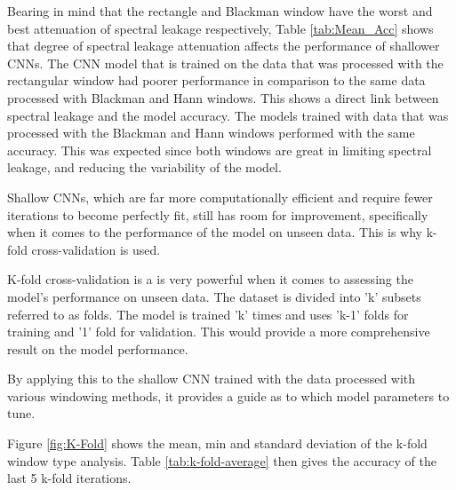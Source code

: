 \documentclass[class=report,11pt,crop=false]{standalone}
\begin{document}
Bearing in mind that the rectangle and Blackman window have the worst and best attenuation of spectral leakage respectively, Table \ref{tab:Mean_Acc} shows that degree of spectral leakage attenuation affects the performance of shallower CNNs. The CNN model that is trained on the data that was processed with the rectangular window had poorer performance in comparison to the same data processed with Blackman and Hann windows. This shows a direct link between spectral leakage and the model accuracy. The models trained with data that was processed with the Blackman and Hann windows performed with the same accuracy. This was expected since both windows are great in limiting spectral leakage, and reducing the variability of the model. 





Shallow CNNs, which are far more computationally efficient and require fewer iterations to become perfectly fit, still has room for improvement, specifically when it comes to the performance of the model on unseen data. This is why k-fold cross-validation is used. 

K-fold cross-validation is a is very powerful when it comes to assessing the model's performance on unseen data. The dataset is divided into 'k' subsets referred to as folds. The model is trained 'k' times and uses 'k-1' folds for training and '1' fold for validation. This would provide a more comprehensive result on the model performance. 

By applying this to the shallow CNN trained with the data processed with various windowing methods, it provides a guide as to which model parameters to tune. 

Figure \ref{fig:K-Fold} shows the mean, min and standard deviation of the k-fold window type analysis. Table \ref{tab:k-fold-average} then gives the accuracy of the last 5 k-fold iterations. 
\end{document}
